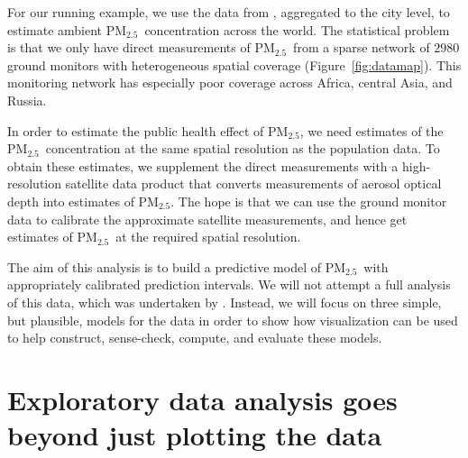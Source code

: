 \documentclass{statsoc}
\newcommand{\PM}{PM$_{2.5}$}
\begin{document}
For our running example, we use the data from \citet{shaddick2017data},
aggregated to the city level, to estimate ambient \PM\ concentration across the
world. The statistical problem is that we only have direct measurements of \PM\
from a sparse network of $2980$ ground monitors with heterogeneous spatial
coverage (Figure~\ref{fig:datamap}). This monitoring network has especially poor
coverage across Africa, central Asia, and Russia.

In order to estimate the public health effect of \PM , we need estimates of the
\PM\ concentration at the same spatial resolution as the population data. To
obtain these estimates, we supplement the direct measurements with a
high-resolution satellite data product that converts measurements of aerosol
optical depth into estimates of \PM.  The hope is that we can use the ground
monitor data to calibrate the approximate satellite measurements, and hence get
estimates of \PM\ at the required spatial resolution.

The aim of this analysis is to build a predictive model of \PM\ with
appropriately calibrated prediction intervals.  We will not attempt a full
analysis of this data, which was undertaken by \citet{shaddick2017data}.
Instead, we will focus on three simple, but plausible, models for the data in
order to show how visualization can be used to help construct, sense-check,
compute, and evaluate these models.


\section{Exploratory data analysis goes beyond just plotting the data}
\label{sec:exploratory}
\end{document}
